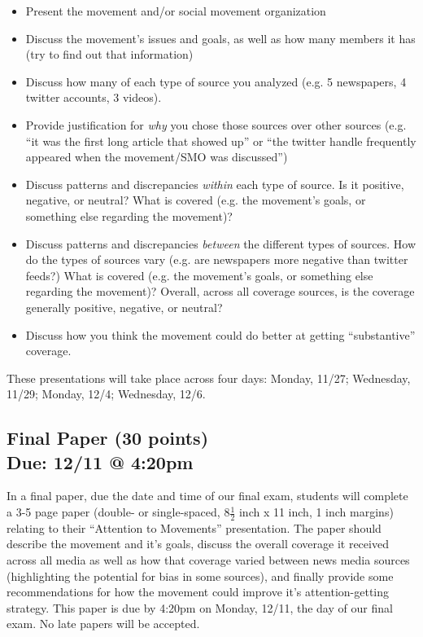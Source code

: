 \documentclass{article}
\begin{document}
\begin{itemize}
\item Present the movement and/or social movement organization
\item Discuss the movement's issues and goals, as well as how many members it has (try to find out that information)
\item Discuss how many of each type of source you analyzed (e.g. 5 newspapers, 4 twitter accounts, 3 videos). 
\item Provide justification for \textit{why} you chose those sources over other sources (e.g. ``it was the first long article that showed up'' or ``the twitter handle frequently appeared when the movement/SMO was discussed'')
\item Discuss patterns and discrepancies \textit{within} each type of source. Is it positive, negative, or neutral? What is covered (e.g. the movement's goals, or something else regarding the movement)?
\item Discuss patterns and discrepancies \textit{between} the different types of sources. How do the types of sources vary (e.g. are newspapers more negative than twitter feeds?) What is covered (e.g. the movement's goals, or something else regarding the movement)? Overall, across all coverage sources, is the coverage generally positive, negative, or neutral?
\item Discuss how you think the movement could do better at getting ``substantive'' coverage.
\end{itemize}

These presentations will take place across four days: Monday, 11/27; Wednesday, 11/29; Monday, 12/4; Wednesday, 12/6. \newline

\begin{centering}
\section*{Final Paper (30 points)\\Due: 12/11 @ 4:20pm}
\end{centering}

In a final paper, due the date and time of our final exam, students will complete a 3-5 page paper (double- or single-spaced, 8$\frac{1}{2}$ inch x 11 inch, 1 inch margins) relating to their ``Attention to Movements'' presentation. The paper should describe the movement and it's goals, discuss the overall coverage it received across all media as well as how that coverage varied between news media sources (highlighting the potential for bias in some sources), and finally provide some recommendations for how the movement could improve it's attention-getting strategy. This paper is due by 4:20pm on Monday, 12/11, the day of our final exam. No late papers will be accepted. \newline
\end{document}
